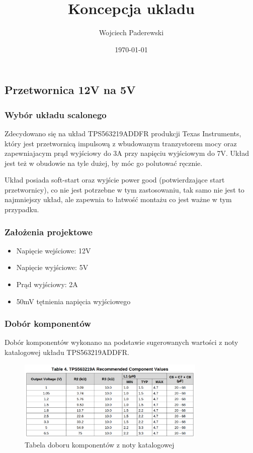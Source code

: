 \documentclass[../../main.tex]{subfiles}
\author{Wojciech Paderewski}
\date{\today}
\title{Koncepcja ukladu}
\begin{document}
\subsection{Przetwornica 12V na 5V}
\subsubsection{Wybór układu scalonego}
Zdecydowano się na układ TPS563219ADDFR produkcji Texas Instruments, który jest przetwornicą impulsową z wbudowanym tranzystorem mocy oraz zapewniajacym prąd wyjściowy do 3A przy 
napięciu wyjściowym do 7V. Układ jest też w obudowie na tyle dużej, by móc go polutować ręcznie. 

Układ posiada soft-start oraz wyjście power good (potwierdzające start przetwornicy), co nie jest potrzebne w tym zastosowaniu, tak samo 
nie jest to najmniejszy układ, ale zapewnia to łatwość montażu co jest ważne w tym przypadku.
\subsubsection{Założenia projektowe}
\begin{itemize}
    \item Napięcie wejściowe: 12V
    \item Napięcie wyjściowe: 5V
    \item Prąd wyjściowy: 2A
    \item 50mV tętnienia napięcia wyjściowego
\end{itemize}
\subsubsection{Dobór komponentów}
Dobór komponentów wykonano na podstawie sugerowanych wartości z noty katalogowej układu TPS563219ADDFR.

\begin{figure}[H]
    \centering
    \includegraphics[width=0.8\textwidth]{conv-table.png}
    \caption{Tabela doboru komponentów z noty katalogowej}
\end{figure}
\end{document}
